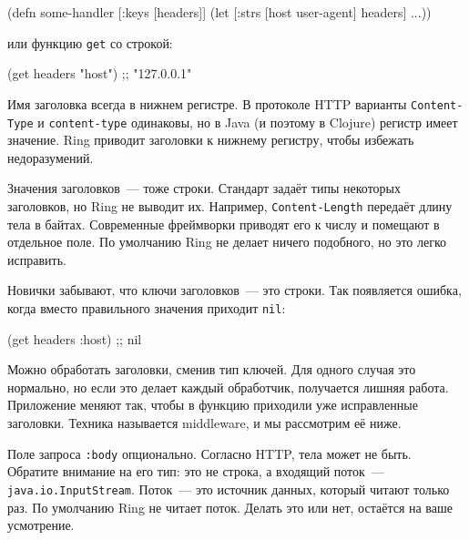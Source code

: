 \else

\begin{english}
  \begin{clojure}
(defn some-handler
  [{:keys [headers]}]
  (let [{:strs [host user-agent]} headers]
    ...))
  \end{clojure}
\end{english}

\fi

\noindent
или функцию \verb|get| со строкой:

\begin{english}
  \begin{clojure}
(get headers "host") ;; "127.0.0.1"
  \end{clojure}
\end{english}


Имя заголовка всегда в нижнем регистре. В протоколе HTTP варианты
\verb|Content-Type| и \verb|content-type| одинаковы, но в Java (и поэтому в
Clojure) регистр имеет значение. Ring приводит заголовки к нижнему регистру,
чтобы избежать недоразумений.

Значения заголовков~--- тоже строки. Стандарт задаёт типы некоторых заголовков,
но Ring не выводит их. Например, \verb|Content-Length| передаёт длину тела в
байтах. Современные фреймворки приводят его к числу и помещают в отдельное
поле. По умолчанию Ring не делает ничего подобного, но это легко исправить.

Новички забывают, что ключи заголовков~--- это строки. Так появляется ошибка, когда
вместо правильного значения приходит \verb|nil|:

\begin{english}
  \begin{clojure}
(get headers :host) ;; nil
  \end{clojure}
\end{english}

Можно обработать заголовки, сменив тип ключей. Для одного случая это
нормально, но если это делает каждый обработчик, получается лишняя
работа. Приложение меняют так, чтобы в функцию приходили уже исправленные
заголовки. Техника называется middleware, и мы рассмотрим её ниже.


Поле запроса \verb|:body| опционально. Согласно HTTP, тела может не
быть. Обратите внимание на его тип: это не строка, а входящий поток~---
\verb|java.io.InputStream|. Поток~--- это источник данных, который читают только
раз. По умолчанию Ring не читает поток. Делать это или нет, остаётся на ваше
усмотрение.

